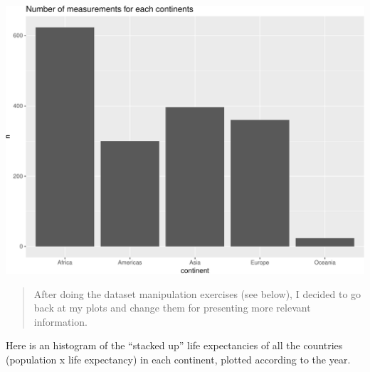 \documentclass[]{article}
\newenvironment{Shaded}{\begin{snugshade}}{\end{snugshade}}
\newcommand{\KeywordTok}[1]{\textcolor[rgb]{0.13,0.29,0.53}{\textbf{{#1}}}}
\newcommand{\DataTypeTok}[1]{\textcolor[rgb]{0.13,0.29,0.53}{{#1}}}
\newcommand{\StringTok}[1]{\textcolor[rgb]{0.31,0.60,0.02}{{#1}}}
\newcommand{\OtherTok}[1]{\textcolor[rgb]{0.56,0.35,0.01}{{#1}}}
\newcommand{\NormalTok}[1]{{#1}}
\begin{document}
\includegraphics{gapminder-exploration-phase2_files/figure-latex/unnamed-chunk-18-1.pdf}

\begin{quote}
After doing the dataset manipulation exercises (see below), I decided to
go back at my plots and change them for presenting more relevant
information.
\end{quote}

Here is an histogram of the ``stacked up'' life expectancies of all the
countries (population x life expectancy) in each continent, plotted
according to the year.

\begin{Shaded}
\end{Shaded}
\end{document}
